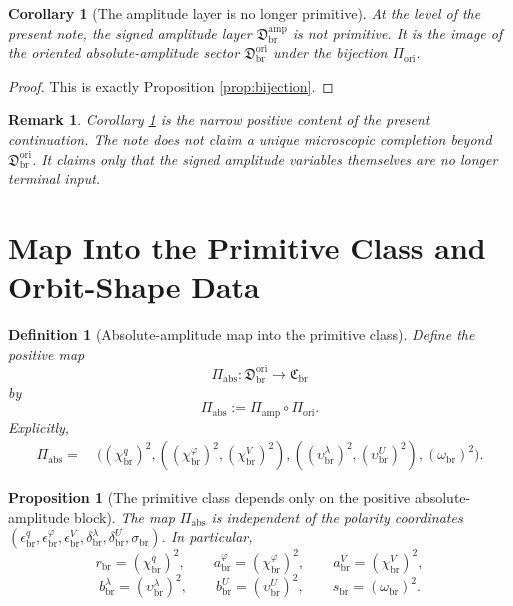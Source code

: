 \documentclass[11pt]{article}
\newcommand{\ScaleMod}{s_{\mathrm{br}}}
\newcommand{\PrimClass}{\mathfrak C_{\mathrm{br}}}
\newcommand{\PrimRead}{r_{\mathrm{br}}}
\newcommand{\PrimCovSlot}{a_{\mathrm{br}}^{\varphi}}
\newcommand{\PrimRelaxSlot}{a_{\mathrm{br}}^{V}}
\newcommand{\PrimWellSlot}{b_{\mathrm{br}}^{\lambda}}
\newcommand{\PrimEqSlot}{b_{\mathrm{br}}^{U}}
\newcommand{\LiftSector}{\mathfrak D_{\mathrm{br}}^{\mathrm{amp}}}
\newcommand{\AmpMap}{\Pi_{\mathrm{amp}}}
\newcommand{\OriginSector}{\mathfrak D_{\mathrm{br}}^{\mathrm{ori}}}
\newcommand{\AbsReadAmp}{\chi_{\mathrm{br}}^{q}}
\newcommand{\AbsCovAmp}{\chi_{\mathrm{br}}^{\varphi}}
\newcommand{\AbsRelaxAmp}{\chi_{\mathrm{br}}^{V}}
\newcommand{\AbsWellAmp}{\upsilon_{\mathrm{br}}^{\lambda}}
\newcommand{\AbsEqAmp}{\upsilon_{\mathrm{br}}^{U}}
\newcommand{\AbsScaleAmp}{\omega_{\mathrm{br}}}
\newcommand{\PolRead}{\epsilon_{\mathrm{br}}^{q}}
\newcommand{\PolCov}{\epsilon_{\mathrm{br}}^{\varphi}}
\newcommand{\PolRelax}{\epsilon_{\mathrm{br}}^{V}}
\newcommand{\PolWell}{\delta_{\mathrm{br}}^{\lambda}}
\newcommand{\PolEq}{\delta_{\mathrm{br}}^{U}}
\newcommand{\PolScale}{\sigma_{\mathrm{br}}}
\newcommand{\OriginMap}{\Pi_{\mathrm{ori}}}
\newcommand{\AbsMap}{\Pi_{\mathrm{abs}}}
\newtheorem{definition}{Definition}
\newtheorem{proposition}{Proposition}
\newtheorem{remark}{Remark}
\newtheorem{corollary}{Corollary}
\begin{document}
\begin{corollary}[The amplitude layer is no longer primitive]
\label{cor:notprimitive}
At the level of the present note, the signed amplitude layer \(\LiftSector\) is not primitive. It is the image of the oriented absolute-amplitude sector \(\OriginSector\) under the bijection \(\OriginMap\).
\end{corollary}

\begin{proof}
This is exactly Proposition \ref{prop:bijection}.
\end{proof}

\begin{remark}
Corollary \ref{cor:notprimitive} is the narrow positive content of the present continuation. The note does not claim a unique microscopic completion beyond \(\OriginSector\). It claims only that the signed amplitude variables themselves are no longer terminal input.
\end{remark}

\section{Map Into the Primitive Class and Orbit-Shape Data}

\begin{definition}[Absolute-amplitude map into the primitive class]
\label{def:absmap}
Define the positive map
\begin{equation}
\AbsMap:\OriginSector\longrightarrow\PrimClass
\label{eq:absmap}
\end{equation}
by
\begin{equation}
\AbsMap:=\AmpMap\circ\OriginMap.
\label{eq:absmapdef}
\end{equation}
Explicitly,
\begin{align}
\AbsMap
=\;&
\bigl(
(\AbsReadAmp)^2,
((\AbsCovAmp)^2,(\AbsRelaxAmp)^2),
((\AbsWellAmp)^2,(\AbsEqAmp)^2),
(\AbsScaleAmp)^2
\bigr).
\label{eq:absexplicit}
\end{align}
\end{definition}

\begin{proposition}[The primitive class depends only on the positive absolute-amplitude block]
\label{prop:absonly}
The map \(\AbsMap\) is independent of the polarity coordinates
\((\PolRead,\PolCov,\PolRelax,\PolWell,\PolEq,\PolScale)\). In particular,
\begin{equation}
\PrimRead=(\AbsReadAmp)^2,
\qquad
\PrimCovSlot=(\AbsCovAmp)^2,
\qquad
\PrimRelaxSlot=(\AbsRelaxAmp)^2,
\label{eq:primA}
\end{equation}
\begin{equation}
\PrimWellSlot=(\AbsWellAmp)^2,
\qquad
\PrimEqSlot=(\AbsEqAmp)^2,
\qquad
\ScaleMod=(\AbsScaleAmp)^2.
\label{eq:primB}
\end{equation}
\end{proposition}
\end{document}
